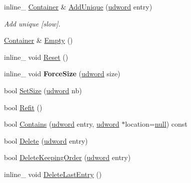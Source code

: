 \begin{DoxyCompactItemize}
\item 
\hypertarget{class_container_a8c6620607260e093f00238b12d2aac5a}{inline\+\_\+ \hyperlink{class_container}{Container} \& \hyperlink{class_container_a8c6620607260e093f00238b12d2aac5a}{Add\+Unique} (\hyperlink{_ice_types_8h_a44c6f1920ba5551225fb534f9d1a1733}{udword} entry)}\label{class_container_a8c6620607260e093f00238b12d2aac5a}

\begin{DoxyCompactList}\small\item\em Add unique \mbox{[}slow\mbox{]}. \end{DoxyCompactList}\item 
\hyperlink{class_container}{Container} \& \hyperlink{class_container_a4d668ec7d3cbeef642906943e053d7fe}{Empty} ()
\item 
inline\+\_\+ void \hyperlink{class_container_a6544f7c7bbc942fe6d3dde661d39214b}{Reset} ()
\item 
\hypertarget{class_container_a6e513df7e95aa3c2345baacbab50978e}{inline\+\_\+ void {\bfseries Force\+Size} (\hyperlink{_ice_types_8h_a44c6f1920ba5551225fb534f9d1a1733}{udword} size)}\label{class_container_a6e513df7e95aa3c2345baacbab50978e}

\item 
bool \hyperlink{class_container_a5556de324fa97f6dbed8f8b85cf4f6e3}{Set\+Size} (\hyperlink{_ice_types_8h_a44c6f1920ba5551225fb534f9d1a1733}{udword} nb)
\item 
bool \hyperlink{class_container_a5a91b8f53d736b761aa75f8f2df3f78a}{Refit} ()
\item 
bool \hyperlink{class_container_ab81b5847d0ca21c32b3db0d3b460d7ee}{Contains} (\hyperlink{_ice_types_8h_a44c6f1920ba5551225fb534f9d1a1733}{udword} entry, \hyperlink{_ice_types_8h_a44c6f1920ba5551225fb534f9d1a1733}{udword} $\ast$location=\hyperlink{_ice_types_8h_ac97b8ee753e4405397a42ad5799b0f9e}{null}) const 
\item 
bool \hyperlink{class_container_af26b7fe0482696af03c7b14b94619995}{Delete} (\hyperlink{_ice_types_8h_a44c6f1920ba5551225fb534f9d1a1733}{udword} entry)
\item 
bool \hyperlink{class_container_a57191aecc817cf1c87d40beeff33c975}{Delete\+Keeping\+Order} (\hyperlink{_ice_types_8h_a44c6f1920ba5551225fb534f9d1a1733}{udword} entry)
\item 
\hypertarget{class_container_abfc2182a69a695b274efc258e5816aff}{inline\+\_\+ void \hyperlink{class_container_abfc2182a69a695b274efc258e5816aff}{Delete\+Last\+Entry} ()}\label{class_container_abfc2182a69a695b274efc258e5816aff}


\end{DoxyCompactItemize}
